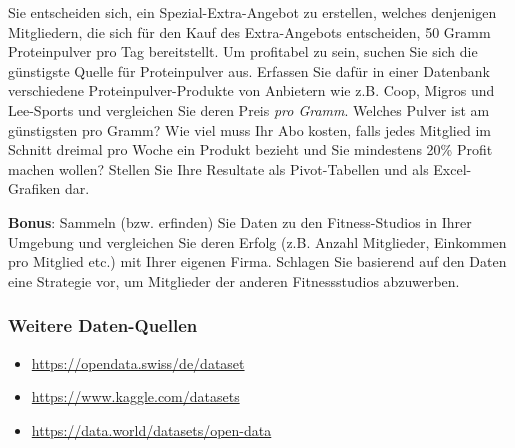 Sie entscheiden sich, ein Spezial-Extra-Angebot zu erstellen, welches denjenigen Mitgliedern, die sich für den Kauf des Extra-Angebots entscheiden, 50 Gramm Proteinpulver pro Tag bereitstellt. Um profitabel zu sein, suchen Sie sich die günstigste Quelle für Proteinpulver aus. Erfassen Sie dafür in einer Datenbank verschiedene Proteinpulver-Produkte von Anbietern wie z.B. Coop, Migros und Lee-Sports und vergleichen Sie deren Preis \textit{pro Gramm}. Welches Pulver ist am günstigsten pro Gramm? Wie viel muss Ihr Abo kosten, falls jedes Mitglied im Schnitt dreimal pro Woche ein Produkt bezieht und Sie mindestens 20\% Profit machen wollen? Stellen Sie Ihre Resultate als Pivot-Tabellen und als Excel-Grafiken dar.

\textbf{Bonus}: Sammeln (bzw. erfinden) Sie Daten zu den Fitness-Studios in Ihrer Umgebung und vergleichen Sie deren Erfolg (z.B. Anzahl Mitglieder, Einkommen pro Mitglied etc.) mit Ihrer eigenen Firma. Schlagen Sie basierend auf den Daten eine Strategie vor, um Mitglieder der anderen Fitnessstudios abzuwerben.


\subsubsection*{Weitere Daten-Quellen}
\begin{itemize}
	\item \url{https://opendata.swiss/de/dataset}
	\item \url{https://www.kaggle.com/datasets}
	\item \url{https://data.world/datasets/open-data}
\end{itemize}

